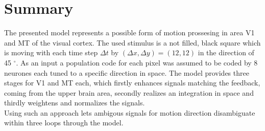 \documentclass[a4paper]{article}
\begin{document}
\section{Summary}
The presented model represents a possible form of motion prossesing in area V1 and MT of the visual cortex. The used stimulus is a not filled, black square which is moving with each time step $\Delta t$ by $(\Delta x, \Delta y)=(12,12)$ in the direction of 45 $^{\circ}$. As an input a population code for each pixel was assumed to be coded by 8 neurones each tuned to a specific direction in space. The model provides three stages for V1 and MT each, which firstly enhances signals matching the feedback, coming from the upper brain area, secondly realizes an integration in space and thirdly weightens and normalizes the signals.\\
Using such an approach lets ambigous signals for motion direction disambiguate within three loops through the model.


\printbibliography[heading=bibintoc]
\end{document}
